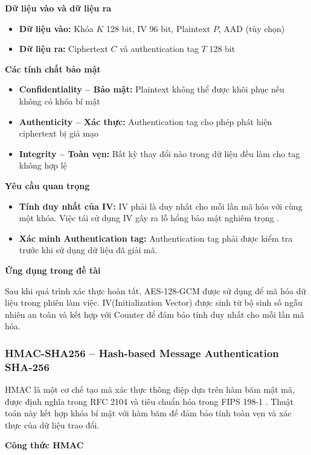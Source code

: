 \textbf{Dữ liệu vào và dữ liệu ra}

\begin{itemize}
    \item \textbf{Dữ liệu vào:} Khóa $K$ 128 bit, IV 96 bit, Plaintext $P$, AAD (tùy chọn)
    \item \textbf{Dữ liệu ra:} Ciphertext $C$ và authentication tag $T$ 128 bit
\end{itemize}

\textbf{Các tính chất bảo mật}

\begin{itemize}
    \item \textbf{Confidentiality – Bảo mật:} Plaintext không thể được khôi phục nếu không có khóa bí mật
    \item \textbf{Authenticity – Xác thực:} Authentication tag cho phép phát hiện ciphertext bị giả mạo
    \item \textbf{Integrity – Toàn vẹn:} Bất kỳ thay đổi nào trong dữ liệu đều làm cho tag không hợp lệ
\end{itemize}

\textbf{Yêu cầu quan trọng}

\begin{itemize}
    \item \textbf{Tính duy nhất của IV:} IV phải là duy nhất cho mỗi lần mã hóa với cùng một khóa. Việc tái sử dụng IV gây ra lỗ hổng bảo mật nghiêm trọng \cite{joux2006authentication}.
    \item \textbf{Xác minh Authentication tag:} Authentication tag phải được kiểm tra trước khi sử dụng dữ liệu đã giải mã.
\end{itemize}

\textbf{Ứng dụng trong đề tài}
\par\vspace{0.5em}
Sau khi quá trình xác thực hoàn tất, AES-128-GCM được sử dụng để mã hóa dữ liệu trong phiên làm việc. IV(Initialization Vector) được sinh từ bộ sinh số ngẫu nhiên an toàn và kết hợp với Counter để đảm bảo tính duy nhất cho mỗi lần mã hóa.

\subsubsection{HMAC-SHA256 – Hash-based Message Authentication SHA-256}

HMAC là một cơ chế tạo mã xác thực thông điệp dựa trên hàm băm mật mã, được định nghĩa trong RFC 2104 \cite{rfc2104} và tiêu chuẩn hóa trong FIPS 198-1 \cite{fips198}.  
Thuật toán này kết hợp khóa bí mật với hàm băm để đảm bảo tính toàn vẹn và xác thực của dữ liệu trao đổi.
\par\vspace{0.5em}
\textbf{Công thức HMAC}

